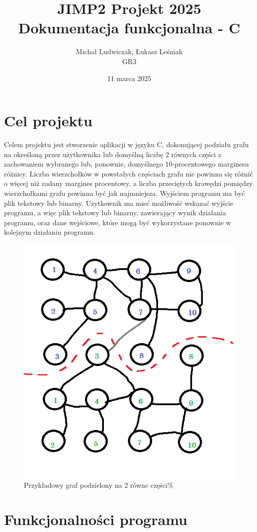 \documentclass{article}
\title{JIMP2 Projekt 2025 \\ {\large Dokumentacja funkcjonalna - C}}
\author{Michał Ludwiczak, Łukasz Leśniak \\ GR3}
\date{11 marca 2025}
\begin{document}
\maketitle




\section{Cel projektu}

Celem projektu jest stworzenie aplikacji w języku C, dokonującej podziału grafu na określoną przez użytkownika lub domyślną liczbę 2 równych części z zachowaniem wybranego lub, ponownie, domyślnego 10-procentowego marginesu różnicy. Liczba wierzchołków w powstałych częściach grafu nie powinna się różnić o więcej niż zadany margines procentowy, a liczba przeciętych krawędzi pomiędzy wierzchołkami grafu powinna być jak najmniejsza. Wyjściem programu ma być plik tekstowy lub binarny. Użytkownik ma mieć możliwość wskazać wyjście programu, a więc plik tekstowy lub binarny, zawierający wynik działania programu, oraz dane wejściowe, które mogą być wykorzystane ponownie w kolejnym działaniu programu.



\begin{figure}[ht]
    \centering
    \includegraphics[width=0.5\linewidth]{graph.png}
    \caption{Przykładowy graf podzielony na 2 równe części\%}
    \label{fig:graph}
\end{figure}



\section{Funkcjonalności programu}
\end{document}
